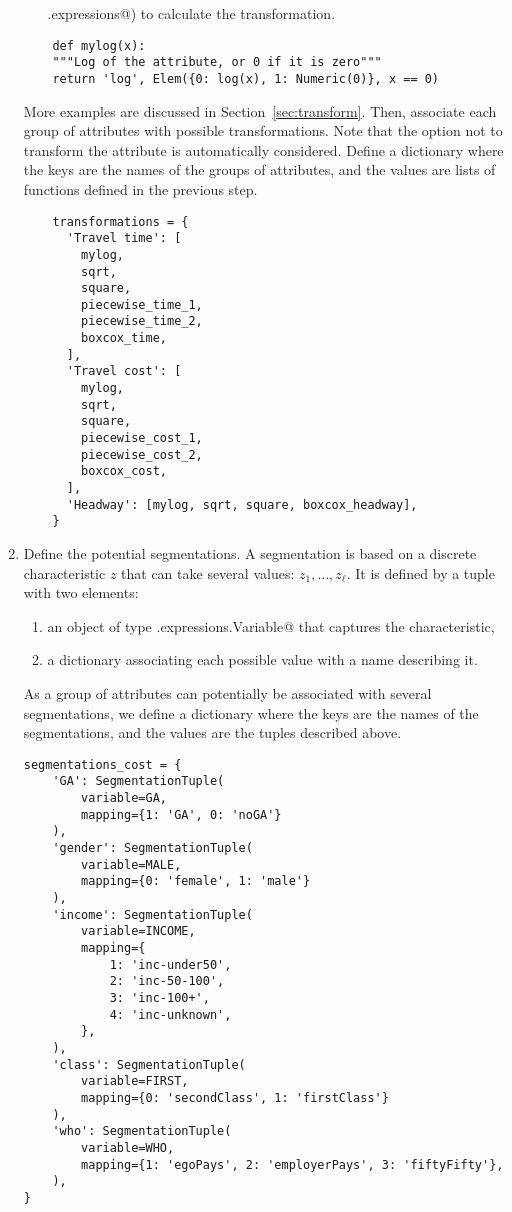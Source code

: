 \documentclass[12pt,a4paper]{article}
\begin{document}
\begin{enumerate}
\begin{enumerate}
    \lstinline@biogeme.expressions@) to calculate the transformation.
  \end{enumerate}
  \begin{lstlisting}
    def mylog(x):
    """Log of the attribute, or 0 if it is zero"""
    return 'log', Elem({0: log(x), 1: Numeric(0)}, x == 0)
  \end{lstlisting}
  More examples are discussed in Section~\ref{sec:transform}.
Then, associate each group of attributes with possible
  transformations. Note that the option not to transform the attribute
  is automatically considered. Define a dictionary where the keys are the
  names of the groups of attributes, and the values are lists of
  functions defined in the previous step.
  \begin{lstlisting}
    transformations = {
      'Travel time': [
        mylog,
        sqrt,
        square,
        piecewise_time_1,
        piecewise_time_2,
        boxcox_time,
      ],
      'Travel cost': [
        mylog,
        sqrt,
        square,
        piecewise_cost_1,
        piecewise_cost_2,
        boxcox_cost,
      ],
      'Headway': [mylog, sqrt, square, boxcox_headway],
    }

  \end{lstlisting}

\item \label{item:segment}Define the  potential segmentations. A segmentation is based on
  a discrete characteristic $z$ that can take several values:
  $z_1,\ldots, z_\ell$. It is defined by a tuple with two elements:
  \begin{enumerate}
  \item an object of type \lstinline@biogeme.expressions.Variable@
    that captures the characteristic,
  \item a dictionary associating each possible value with a name
    describing it.
  \end{enumerate}
  As a group of attributes can potentially be associated with several
  segmentations, we define a dictionary where the keys are the names
  of the segmentations, and the values are the tuples described above.
  \begin{lstlisting}
segmentations_cost = {
    'GA': SegmentationTuple(
        variable=GA,
        mapping={1: 'GA', 0: 'noGA'}
    ),
    'gender': SegmentationTuple(
        variable=MALE,
        mapping={0: 'female', 1: 'male'}
    ),
    'income': SegmentationTuple(
        variable=INCOME,
        mapping={
            1: 'inc-under50',
            2: 'inc-50-100',
            3: 'inc-100+',
            4: 'inc-unknown',
        },
    ),
    'class': SegmentationTuple(
        variable=FIRST,
        mapping={0: 'secondClass', 1: 'firstClass'}
    ),
    'who': SegmentationTuple(
        variable=WHO,
        mapping={1: 'egoPays', 2: 'employerPays', 3: 'fiftyFifty'},
    ),
}
  \end{lstlisting}


\end{enumerate}
\end{document}
